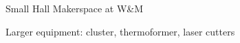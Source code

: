 \documentclass[xcolor={dvipsnames},professionalfonts]{beamer}
\begin{document}
\begin{frame}{Small Hall Makerspace at W\&M}
 \begin{block}{Larger equipment: cluster, thermoformer, laser cutters}
 \begin{center}
   \quad {}
 \end{center}
 \end{block}
\end{frame}

\end{document}
